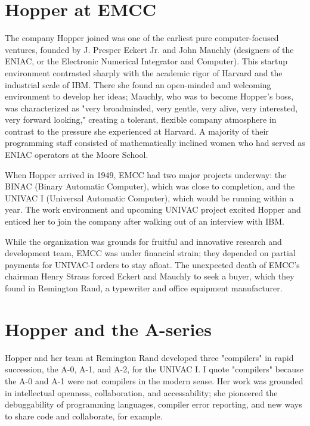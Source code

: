 \section{Hopper at EMCC}

The company Hopper joined was one of the earliest pure computer-focused ventures,
founded by J. Presper Eckert Jr. and John Mauchly
(designers of the ENIAC, or the Electronic Numerical Integrator and Computer).
This startup environment contrasted sharply with the academic rigor of Harvard and the industrial scale of IBM.
There she found an open-minded and welcoming environment to develop her ideas;
Mauchly, who was to become Hopper's boss, was characterized as 
"very broadminded, very gentle, very alive, very interested, very forward looking,"\cite{grace_hopper_and_the_invention_of_the_information_age_2009}
creating a tolerant, flexible company atmosphere in contrast to the pressure she experienced at Harvard.
A majority of their programming staff consisted of mathematically inclined women
who had served as ENIAC operators at the Moore School.

When Hopper arrived in 1949, EMCC had two major projects underway:
the BINAC (Binary Automatic Computer), which was close to completion,
and the UNIVAC I (Universal Automatic Computer), which would be running within a year.
The work environment and upcoming UNIVAC project excited Hopper and enticed her to join the company
after walking out of an interview with IBM.

While the organization was grounds for fruitful and innovative research and development team,
EMCC was under financial strain; they depended on partial payments for UNIVAC-I orders to stay afloat.
The unexpected death of EMCC's chairman Henry Straus forced Eckert and Mauchly to seek a buyer,
which they found in Remington Rand, a typewriter and office equipment manufacturer.

\section{Hopper and the A-series}

Hopper and her team at Remington Rand developed three "compilers"
in rapid succession, the A-0, A-1, and A-2, for the UNIVAC I.
I quote "compilers" because the A-0 and A-1 were not compilers in the modern sense.
Her work was grounded in intellectual openness, collaboration, and accessability;
she pioneered the debuggability of programming languages, compiler error reporting,
and new ways to share code and collaborate, for example.

